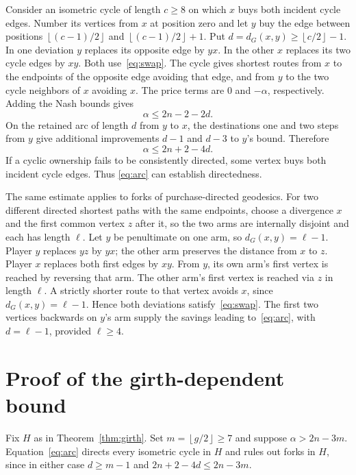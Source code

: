 \documentclass[11pt]{article}
\newcommand{\dG}{d_G}
\newcommand{\floor}[1]{\left\lfloor#1\right\rfloor}
\begin{document}
Consider an isometric cycle of length \(c\ge8\) on which \(x\)
buys both incident cycle edges. Number its vertices from \(x\)
at position zero and let \(y\) buy the edge between positions
\(\floor{(c-1)/2}\) and \(\floor{(c-1)/2}+1\).
Put \(d=\dG(x,y)\ge\floor{c/2}-1\). In one deviation \(y\) replaces
its opposite edge by \(yx\). In the other \(x\) replaces its two
cycle edges by \(xy\). Both use~\eqref{eq:swap}. The cycle gives
shortest routes from \(x\) to the endpoints of the opposite edge
avoiding that edge, and from \(y\) to the two cycle neighbors
of \(x\) avoiding \(x\).
The price terms are \(0\) and \(-\alpha\), respectively. Adding
the Nash bounds gives
\[
 \alpha\le 2n-2-2d.
 \tag{2}\label{eq:opposite}
\]
On the retained arc of length \(d\) from \(y\) to \(x\),
the destinations one and two steps from \(y\) give additional
improvements \(d-1\) and \(d-3\) to \(y\)'s bound. Therefore
\[
 \alpha\le 2n+2-4d.
 \tag{3}\label{eq:arc}
\]
If a cyclic ownership fails to be consistently directed,
some vertex buys both incident cycle edges. Thus
\eqref{eq:arc} can establish directedness.

The same estimate applies to forks of purchase-directed geodesics.
For two different directed shortest paths with the same endpoints,
choose a divergence \(x\) and the first common vertex \(z\) after it,
so the two arms are internally disjoint and each has length \(\ell\).
Let \(y\) be penultimate on one arm, so \(\dG(x,y)=\ell-1\).
Player \(y\) replaces \(yz\) by \(yx\); the other arm preserves
the distance from \(x\) to \(z\). Player \(x\) replaces both first
edges by \(xy\). From \(y\), its own arm's first vertex is reached
by reversing that arm. The other arm's first vertex is reached
via \(z\) in length \(\ell\). A strictly shorter route to that
vertex avoids \(x\), since \(\dG(x,y)=\ell-1\). Hence both deviations
satisfy~\eqref{eq:swap}. The first two vertices backwards on
\(y\)'s arm supply the savings leading to~\eqref{eq:arc}, with
\(d=\ell-1\), provided \(\ell\ge4\).

\section{Proof of the girth-dependent bound}

Fix \(H\) as in Theorem~\ref{thm:girth}. Set \(m=\floor{g/2}\ge7\)
and suppose \(\alpha>2n-3m\). Equation~\eqref{eq:arc} directs every
isometric cycle in \(H\) and rules out forks in \(H\), since in either
case \(d\ge m-1\) and \(2n+2-4d\le 2n-3m\).
\end{document}
